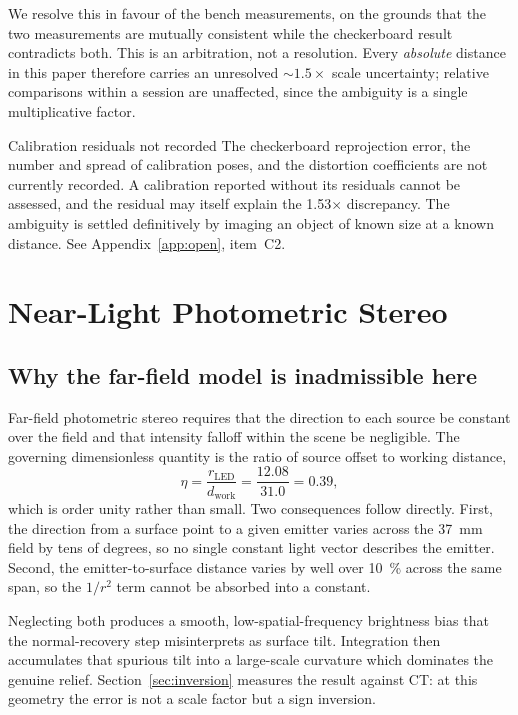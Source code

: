 \documentclass[journal,10pt]{IEEEtran}
\begin{document}
We resolve this in favour of the bench measurements, on the grounds that the two
measurements are mutually consistent while the checkerboard result contradicts
both. This is an arbitration, not a resolution. Every \emph{absolute} distance
in this paper therefore carries an unresolved ${\sim}1.5\times$ scale
uncertainty; relative comparisons within a session are unaffected, since the
ambiguity is a single multiplicative factor.

\begin{todobox}{Calibration residuals not recorded}
The checkerboard reprojection error, the number and spread of calibration poses,
and the distortion coefficients are not currently recorded. A calibration
reported without its residuals cannot be assessed, and the residual may itself
explain the \num{1.53}$\times$ discrepancy. The ambiguity is settled definitively
by imaging an object of known size at a known distance. See
Appendix~\ref{app:open}, item~C2.
\end{todobox}

\section{Near-Light Photometric Stereo}\label{sec:nlps}

\subsection{Why the far-field model is inadmissible here}\label{sec:whyfar}
Far-field photometric stereo requires that the direction to each source be
constant over the field and that intensity falloff within the scene be
negligible. The governing dimensionless quantity is the ratio of source offset
to working distance,
\begin{equation}
\eta = \frac{r_\mathrm{LED}}{d_\mathrm{work}} = \frac{12.08}{31.0} = 0.39 ,
\end{equation}
which is order unity rather than small. Two consequences follow directly. First,
the direction from a surface point to a given emitter varies across the
\SI{37}{\milli\metre} field by tens of degrees, so no single constant light
vector describes the emitter. Second, the emitter-to-surface distance varies by
well over \SI{10}{\percent} across the same span, so the $1/r^2$ term cannot be
absorbed into a constant.

Neglecting both produces a smooth, low-spatial-frequency brightness bias that
the normal-recovery step misinterprets as surface tilt. Integration then
accumulates that spurious tilt into a large-scale curvature which dominates the
genuine relief. Section~\ref{sec:inversion} measures the result against CT: at
this geometry the error is not a scale factor but a sign inversion.
\end{document}
